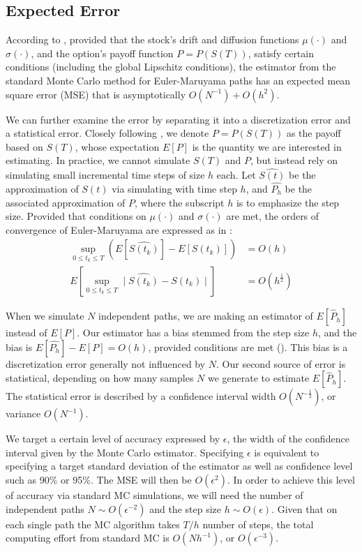 \documentclass{article}
\begin{document}
\subsection{Expected Error}
    According to \cite{giles08}, provided that the stock's drift and diffusion functions $\mu(\cdot)$ and $\sigma(\cdot)$, and the option's payoff function $P=P(S(T))$, satisfy certain conditions (including the global Lipschitz conditions), the estimator from the standard Monte Carlo method for Euler-Maruyama paths has an expected mean square error (MSE) that is asymptotically $O(N^{-1}) + O(h^2)$. 
    
	We can further examine the error by separating it into a discretization error and a statistical error. Closely following \cite{giles08}, we denote $P=P(S(T))$ as the payoff based on $S(T)$, whose expectation $E[P]$ is the quantity we are interested in estimating. In practice, we cannot simulate $S(T)$ and $P$, but instead rely on simulating small incremental time steps of size $h$ each. Let $\widehat{S(t)}$ be the approximation of $S(t)$ via simulating with time step $h$, and $\widehat{P_h}$ be the associated approximation of $P$, where the subscript $h$ is to emphasize the step size. Provided that conditions on $\mu(\cdot)$ and $\sigma(\cdot)$ are met, the orders of convergence of Euler-Maruyama are expressed as in \cite{higham15}:
	\begin{align*}
	\sup_{0 \leq t_k \leq T} (E[\widehat{S(t_k)}] - E[S(t_k)]) &= O(h) \\
	E[\sup_{0 \leq t_k \leq T}\mid \widehat{S(t_k)} - S(t_k)\mid ] &= O(h^{\frac{1}{2}})
	\end{align*}
    
	When we simulate $N$ independent paths, we are making an estimator of $E[\widehat{P}_h]$ instead of $E[P]$. Our estimator has a bias stemmed from the step size $h$, and the bias is $E[\widehat{P_h}] - E[P] = O(h)$, provided conditions are met (\cite{higham15}). This bias is a discretization error generally not influenced by $N$. Our second source of error is statistical, depending on how many samples $N$ we generate to estimate $E[\widehat{P}_h]$. The statistical error is described by a confidence interval width $O(N^{-\frac{1}{2}})$, or variance $O(N^{-1})$.
	
    We target a certain level of accuracy expressed by $\epsilon$, the width of the confidence interval given by the Monte Carlo estimator. Specifying $\epsilon$ is equivalent to specifying a target standard deviation of the estimator as well as confidence level such as 90\% or 95\%. The MSE will then be $O(\epsilon^2)$. In order to achieve this level of accuracy via standard MC simulations, we will need the number of independent paths $N \sim O(\epsilon^{-2})$ and the step size $h \sim O(\epsilon)$. Given that on each single path the MC algorithm takes $T/h$ number of steps, the total computing effort from standard MC is $O(Nh^{-1})$, or $O(\epsilon^{-3})$. 
    
\end{document}

